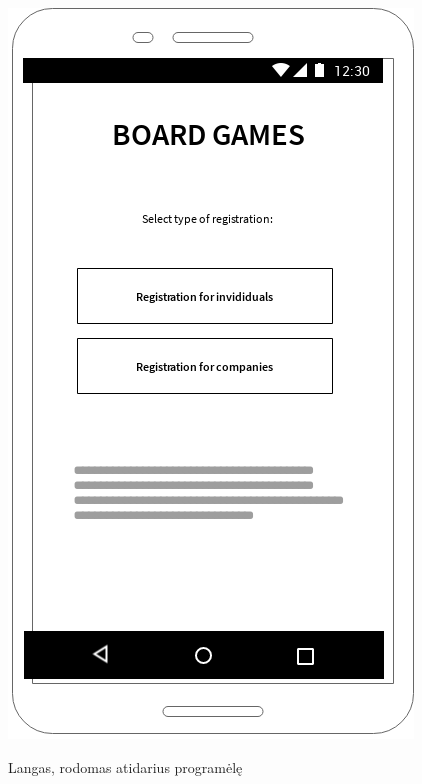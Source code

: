 \documentclass{VUMIFPSkursinis}
\begin{document}
\begin{figure}[H]
	\centering
	\caption{Langas, rodomas atidarius programėlę}
	\includegraphics[scale=0.9]{img/entrance_window}
	\label{img:entrance_window}
\end{figure}
\end{document}
